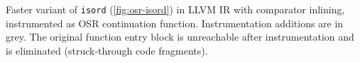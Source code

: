\label{fig:osr-isordto} Faster variant of {\tt isord} (\myfigure\ref{fig:osr-isord}) in LLVM IR with comparator inlining, instrumented as OSR continuation function. Instrumentation additions are in grey. The original function entry block is unreachable after instrumentation and is eliminated (struck-through code fragments).
